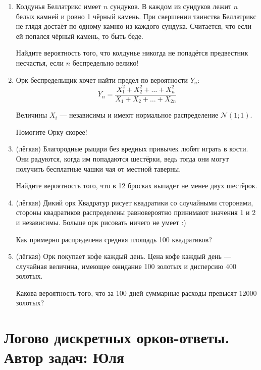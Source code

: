 \documentclass[a4paper,12pt]{article}
\def \cN{\mathcal{N}}
\begin{document}
\begin{enumerate} %
\item %
Колдунья Беллатрикс имеет $n$ сундуков. В каждом из сундуков лежит $n$ белых камней и ровно 1 чёрный камень. При свершении таинства Беллатрикс не глядя достаёт по одному камню из каждого сундука. Считается, что если ей попался чёрный камень, то быть беде.

Найдите вероятность того, что колдунье никогда не попадётся предвестник несчастья, если $n$ беспредельно велико!
\item  %
Орк-беспредельщик хочет найти предел по вероятности $Y_n$:
\[
Y_n = \frac{X_1^2 + X_2^2 + \ldots + X_n^2}{X_1 + X_2 + \ldots + X_{2n}}
\]

Величины $X_i$ — независимы и имеют нормальное распределение $\cN(1;1)$.

Помогите Орку скорее!

\item (лёгкая)%
Благородные рыцари без вредных привычек любят играть в кости. Они радуются, когда им попадаются шестёрки, ведь тогда они могут получить бесплатные чашки чая от местной таверны.

Найдите вероятность того, что в 12 бросках выпадет не менее двух шестёрок.
\item (лёгкая)
Дикий орк Квадратур рисует квадратики со случайными сторонами, стороны квадратиков распределены равновероятно принимают значения 1 и 2 и независимы. Больше орк рисовать ничего не умеет :)

Как примерно распределена средняя площадь 100 квадратиков?

\item (лёгкая)
Орк покупает кофе каждый день. Цена кофе каждый день — случайная величина, имеющее ожидание 100 золотых и дисперсию 400 золотых.

Какова вероятность того, что за 100 дней суммарные расходы превысят 12000 золотых?
\end{enumerate}

\newpage
\section{Логово дискретных орков-ответы. Автор задач: Юля}
\end{document}
